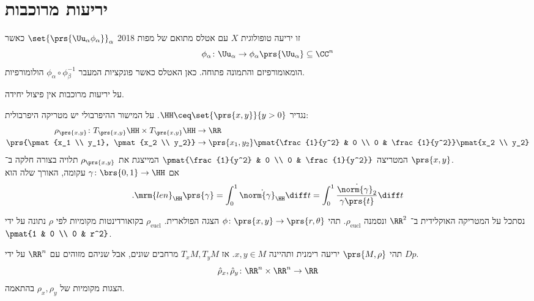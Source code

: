 \documentclass[a4paper,10pt,twoside,openany]{book}
\begin{document}
\section{יריעות מרוכבות}
\begin{definition}
זו יריעה טופולוגית
$X$
עם אטלס מתואם של מפות%
%
{2018}
$\set{\prs{\Uu_{\alpha} \phi_{\alpha}}}_{\alpha}$
כאשר
\[\phi_{\alpha} \colon \Uu_{\alpha} \to \phi_{\alpha}\prs{\Uu_{\alpha}} \subseteq \CC^n\]
הומאומורפיזם והתמונה פתוחה.
כאן האטלס
כאשר פונקציות המעבר
$\phi_{\alpha} \circ \phi_{\beta}^{-1}$
הולומורפיות.
\end{definition}
\begin{remark}
על יריעות מרוכבות אין פיצול יחידה.
\end{remark}
\begin{example}
נגדיר
$\HH \ceq \set{\prs{x,y}}{y >0}$.
על המישור ההיפרבולי יש מטריקה היפרבולית:
\begin{align*}
\rho_{\prs{x,y}} \colon T_{\prs{x,y}}\HH \times T_{\prs{x,y}}\HH &\to \RR \\
\prs{\pmat{x_1 \\ y_1}, \pmat{x_2 \\ y_2}} &\to \prs{x_1,y_2} \pmat{\frac{1}{y^2} & 0 \\ 0 & \frac{1}{y^2}} \pmat{x_2 \\ y_2}
\end{align*}
המטריצה
$\pmat{\frac{1}{y^2} & 0 \\ 0 & \frac{1}{y^2}}$
המייצגת את
$\rho_{\prs{x,y}}$
תלויה בצורה חלקה ב־%
$\prs{x,y}$.\\
אם
$\gamma \colon \brs{0,1} \to \HH$
עקומה, האורך שלה הוא
\[\text{.}\mrm{len}_{\HH}\prs{\gamma} = \int_0^1 \dot{\norm{\gamma}_{\HH}}\diff t = \int_0^1 \frac{\dot{\norm{\gamma}_2}}{\gamma\prs{t}} \diff t\]
\end{example}
\begin{example}
נסתכל על המטריקה האוקלידית ב־%
$\RR^2$
ונסמנה
$\rho_{\text{eucl}}$.
תהי
$\phi \colon \prs{x,y} \to \prs{r,\theta}$
הצגה הפולארית.
$\rho_{\text{eucl}}$
בקואורדינטות מקומיות לפי
$\rho$
נתונה על ידי
$\pmat{1 & 0 \\ 0 & r^2}$.
\end{example}
\begin{example}
תהי
$\prs{M,\rho}$
יריעה רימנית ותהיינה
$x,y \in M$.
אז
$T_xM, T_yM$
מרחבים שונים, אבל שניהם מזוהים עם
$\RR^n$
על ידי
$Dp$.
\[\hat{\rho}_x, \hat{\rho}_y \colon \RR^n \times \RR^n \to \RR\]
הצגות מקומיות של
$\rho_x, \rho_y$
בהתאמה.
\end{example}
\end{document}
